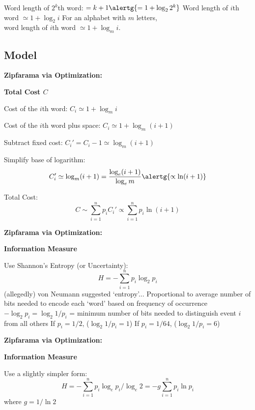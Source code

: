   
    
     Word length of $2^k$th word:
      $= k+1 {\alertg{= 1+\log_2 2^k }}$
     Word length of $i$th word $\simeq 1 + \log_2 i$
     For an alphabet with $m$ letters,\\
      word length of $i$th word $\simeq 1 + \log_m i$.
    
  


\subsection{Model}

  \textbf{Zipfarama via Optimization:}

  \textbf{Total Cost $C$}
    
    
      Cost of the $i$th word:
      $
      C_i \simeq 1 + \log_{m} i
      $
    
      Cost of the $i$th word plus space:
      $
      C_i \simeq 1 + \log_{m} (i + 1)
      $
    
      Subtract fixed cost:
      $ C_i' = C_i - 1 \simeq \log_{m} (i + 1) $
    
      Simplify base of logarithm:
      $$ 
      C_i' \simeq \log_{m} (i+1) = \frac{\log_e (i+1)}{\log_e m}
      {\alertg{\propto \ln (i+1)}}
      $$
    
      Total Cost:
      $$
      C \sim \sum_{i=1}^n p_i C_i' \propto \sum_{i=1}^n p_i \ln (i+1)
      $$
    
  



  \textbf{Zipfarama via Optimization:}

  \textbf{Information Measure}
    
     Use Shannon's Entropy (or Uncertainty): 
      $$ 
      H = -\sum_{i=1}^n p_i \log_2 p_i
      $$
     (allegedly) von Neumann suggested `entropy'...
     Proportional to average number of bits needed to encode each `word'
      based on frequency of occurrence
     $-\log_2 p_i = \log_2 1/p_i$ = minimum number
      of bits needed to distinguish event $i$ from all others
     If $p_i = 1/2$,  ($\log_{2} 1/p_i = 1$)
     If $p_i = 1/64$,  ($\log_{2} 1/p_i = 6$)
    
  


  \textbf{Zipfarama via Optimization:}

  \textbf{Information Measure}
    
           
      Use a slightly simpler form:
      $$ 
      H = -\sum_{i=1}^n p_i \log_e {p_i}/\log_e{2} 
      {= -g \sum_{i=1}^n p_i \ln p_i}
      $$
      {\mbox{}\hfill where $g = 1/\ln{2}$}
    
